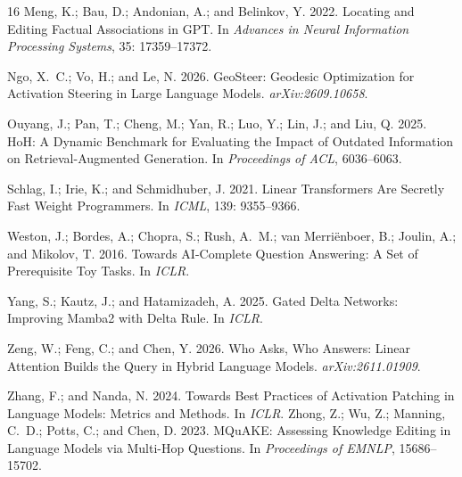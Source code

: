 \documentclass[letterpaper]{article}
\begin{document}
\begin{thebibliography}{16}
Meng, K.; Bau, D.; Andonian, A.; and Belinkov, Y. 2022.
Locating and Editing Factual Associations in GPT.
In \emph{Advances in Neural Information Processing Systems}, 35: 17359--17372.

Ngo, X.~C.; Vo, H.; and Le, N. 2026. GeoSteer: Geodesic Optimization for Activation Steering in Large Language Models. \emph{arXiv:2609.10658}.

Ouyang, J.; Pan, T.; Cheng, M.; Yan, R.; Luo, Y.; Lin, J.; and Liu, Q.
2025. HoH: A Dynamic Benchmark for Evaluating the Impact of Outdated
Information on Retrieval-Augmented Generation. In \emph{Proceedings of
ACL}, 6036--6063.

Schlag, I.; Irie, K.; and Schmidhuber, J. 2021.
Linear Transformers Are Secretly Fast Weight Programmers.
In \emph{ICML}, 139: 9355--9366.

Weston, J.; Bordes, A.; Chopra, S.; Rush, A.~M.; van Merri\"enboer, B.;
Joulin, A.; and Mikolov, T. 2016. Towards AI-Complete Question
Answering: A Set of Prerequisite Toy Tasks. In \emph{ICLR}.

Yang, S.; Kautz, J.; and Hatamizadeh, A. 2025.
Gated Delta Networks: Improving Mamba2 with Delta Rule.
In \emph{ICLR}.

Zeng, W.; Feng, C.; and Chen, Y. 2026.
Who Asks, Who Answers: Linear Attention Builds the Query in Hybrid
Language Models. \emph{arXiv:2611.01909}.

Zhang, F.; and Nanda, N. 2024.
Towards Best Practices of Activation Patching in Language Models:
Metrics and Methods. In \emph{ICLR}.
Zhong, Z.; Wu, Z.; Manning, C.~D.; Potts, C.; and Chen, D. 2023.
MQuAKE: Assessing Knowledge Editing in Language Models via Multi-Hop
Questions. In \emph{Proceedings of EMNLP}, 15686--15702.
\end{thebibliography}
\end{document}
